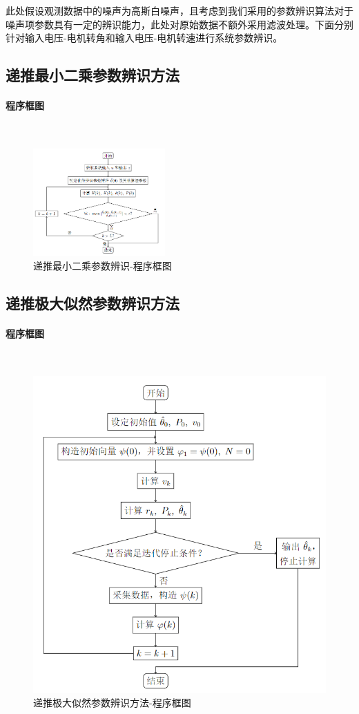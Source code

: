 \documentclass[UTF8, twocolumn]{article}
\begin{document}
此处假设观测数据中的噪声为高斯白噪声，且考虑到我们采用的参数辨识算法对于噪声项参数具有一定的辨识能力，此处对原始数据不额外采用滤波处理。下面分别针对输入电压-电机转角和输入电压-电机转速进行系统参数辨识。

\subsection{递推最小二乘参数辨识方法}
\paragraph{程序框图}~{}
\begin{figure}[H]
    \centering %
    \includegraphics[width=0.45\textwidth]{figure/最小二乘-程序框图.png} 
    \caption{递推最小二乘参数辨识-程序框图} %
\end{figure}

\subsection{递推极大似然参数辨识方法}
\paragraph{程序框图}~{}
\begin{figure}[H]
    \centering %
    \includegraphics[width=.45\textwidth]{figure/极大似然-程序框图.png} 
    \caption{递推极大似然参数辨识方法-程序框图} %
\end{figure}
\end{document}
